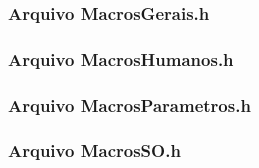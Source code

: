 

\newpage

\subsubsection{Arquivo MacrosGerais.h}



\newpage

\subsubsection{Arquivo MacrosHumanos.h}



\newpage

\subsubsection{Arquivo MacrosParametros.h}



\newpage

\subsubsection{Arquivo MacrosSO.h}




\newpage